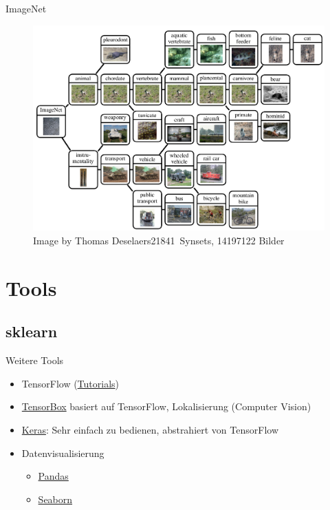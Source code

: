 \documentclass{beamer}
\begin{document}
\begin{frame}{ImageNet}
    \begin{figure}
        \centering
        \includegraphics[width=\textwidth,height=0.7\textheight,keepaspectratio]{../images/prototypes-thomas-deselaers.jpg}
        \caption{Image by Thomas Deselaers\newline\num{21841}~Synsets, \num{14197122} Bilder}
        \label{fig:image-net}
    \end{figure}
\end{frame}


\section{Tools}
\subsection{sklearn}
\begin{frame}{Weitere Tools}
    \begin{itemize}
        \item TensorFlow (\href{https://www.tensorflow.org/versions/r0.8/tutorials/index.html}{Tutorials})
        \item \href{https://github.com/Russell91/TensorBox}{TensorBox} basiert auf TensorFlow, Lokalisierung (Computer Vision)
        \item \href{http://keras.io/}{Keras}: Sehr einfach zu bedienen,
              abstrahiert von TensorFlow
        \item Datenvisualisierung
            \begin{itemize}
                \item \href{http://pandas.pydata.org/}{Pandas}
                \item \href{https://web.stanford.edu/~mwaskom/software/seaborn/}{Seaborn}
            \end{itemize}
    \end{itemize}
\end{frame}
\end{document}

